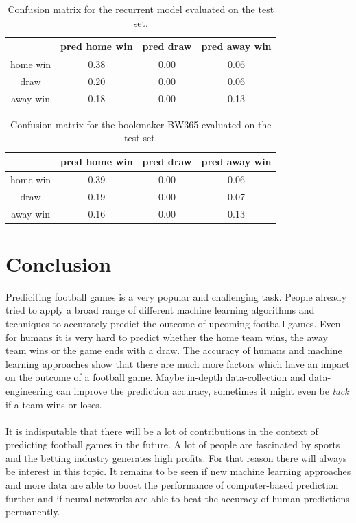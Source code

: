 \documentclass[a4paper]{article}
\begin{document}
\begin{table}
\begin{tabular}{|c||c|c|c|}
\hline 
 & pred home win & pred draw  & pred away win \\ 
\hline 
\hline
home win & 0.38 & 0.00 & 0.06 \\ 
\hline 
draw & 0.20 & 0.00 & 0.06 \\ 
\hline 
away win & 0.18 & 0.00 & 0.13 \\ 
\hline 
\end{tabular} 
\caption{Confusion matrix for the recurrent model evaluated on the test set.}
\label{tab:confrnn}
\end{table}


\begin{table}
\begin{tabular}{|c||c|c|c|}
\hline 
 & pred home win & pred draw  & pred away win \\ 
\hline 
\hline
home win & 0.39 & 0.00 & 0.06 \\ 
\hline 
draw & 0.19 & 0.00 & 0.07 \\ 
\hline 
away win & 0.16 & 0.00 & 0.13 \\ 
\hline 
\end{tabular} 
\caption{Confusion matrix for the bookmaker BW365 evaluated on the test set.}
\label{tab:confbm}
\end{table}

\FloatBarrier

\section{Conclusion}
\label{conclusion}
Prediciting football games is a very popular and challenging task. People
already tried to apply a broad range of different machine learning algorithms
and techniques to accurately predict the outcome of upcoming football games.
Even for humans it is very hard to predict whether the home team wins, the away
team wins or the game ends with a draw. The accuracy of humans and machine
learning approaches show that there are much more factors which have an impact
on the outcome of a football game. Maybe in-depth data-collection and
data-engineering can improve the prediction accuracy, sometimes it might even be
\textit{luck} if a team wins or loses.
\\\\
It is indisputable that there will be a lot of contributions in the context of
predicting football games in the future. A lot of people are fascinated by
sports and the betting industry generates high profits. For that reason there
will always be interest in this topic. It remains to be seen if new machine
learning approaches and more data are able to boost the performance of
computer-based prediction further and if neural networks are able to beat the
accuracy of human predictions permanently.



\end{document}
